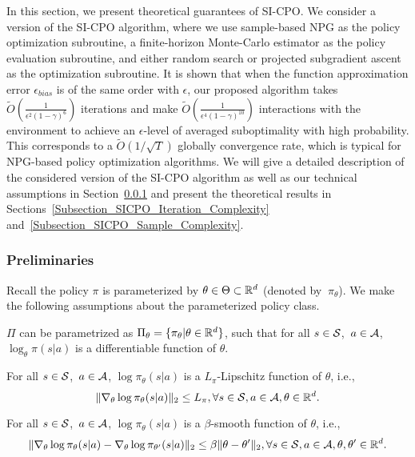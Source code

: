 In this section, we present theoretical guarantees of SI-CPO.
We consider a version of the SI-CPO algorithm, where we use sample-based NPG \citep{agarwal2021theory} as the policy optimization subroutine, a finite-horizon Monte-Carlo estimator as the policy evaluation subroutine, and either random search or projected subgradient ascent as the optimization subroutine.
It is shown that when the function approximation error $\epsilon_{bias}$ is of the same order with $\epsilon$, our proposed algorithm takes $\widetilde{O}\left(\frac{1}{\epsilon^2(1-\gamma)^6}\right)$ iterations and make $\widetilde{O}\left(\frac{1}{\epsilon^4(1-\gamma)^{10}}\right)$ interactions with the environment to achieve an $\epsilon$-level of averaged suboptimality with high probability.
This corresponds to a $\widetilde{O}(1/\sqrt{T})$ globally convergence rate, which is typical for NPG-based policy optimization algorithms.
We will give a detailed description of the considered version of the SI-CPO algorithm as well as our technical assumptions in Section~\ref{Subsection_SICPO_Prem} and present the theoretical results in Sections~\ref{Subsection_SICPO_Iteration_Complexity} and~\ref{Subsection_SICPO_Sample_Complexity}.

\subsubsection{Preliminaries}\label{Subsection_SICPO_Prem}
Recall the policy $\pi$ is parameterized by $\theta\in\Theta\subset{\mathbb R}^d$ (denoted by $~\pi_\theta$).
We make the following assumptions about the parameterized policy class.
\begin{assumption}\label{Assumption_differentiable}
$\Pi$ can be parametrized as $\Pi_\theta=\{\pi_\theta|\theta\in{\mathbb R}^d\}$, such that for all $s\in{\mathcal{S}}$,~$a\in{\mathcal{A}}$, $\log_\theta\pi(s|a)$ is a differentiable function of $\theta$.
\end{assumption}

\begin{assumption}\label{Assumption_Lipschitz_policy}
For all $s\in{\mathcal{S}}$,~$a\in{\mathcal{A}}$, $\log\pi_\theta(s|a)$ is a $L_\pi$-Lipschitz function of $\theta$, i.e.,
$$
\|\nabla_\theta\log\pi_\theta(s|a)\|_{2}\leq L_\pi,\forall s\in{\mathcal{S}},a\in{\mathcal{A}},\theta\in {\mathbb R}^d.
$$
\end{assumption}

\begin{assumption}\label{Assumption_smooth}
For all $s\in{\mathcal{S}}$,~$a\in{\mathcal{A}}$, $\log\pi_\theta(s|a)$ is a $\beta$-smooth function of $\theta$, i.e.,
$$
\|\nabla_\theta\log\pi_\theta(s|a)-\nabla_\theta\log\pi_{\theta^\prime}(s|a)\|_{2}\leq \beta\|\theta-\theta^\prime\|_2,\forall s\in{\mathcal{S}},a\in{\mathcal{A}},\theta,\theta^\prime\in {\mathbb R}^d.
$$
\end{assumption}

